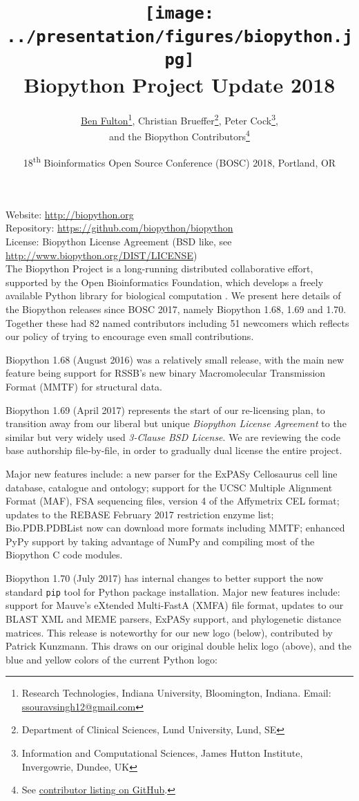 \documentclass[10pt,oneside]{article}
\title{%
\vspace{-1.5in}
\texttt{[image: ../presentation/figures/biopython.jpg]} \\
\vspace{3mm}Biopython Project Update 2018}
\author{
	\underline{Ben Fulton}\thanks{Research Technologies, Indiana University, Bloomington, Indiana. Email: \href{mailto:befulton@iu.edu}{ssouravsingh12@gmail.com}},
    Christian Brueffer\thanks{Department of Clinical Sciences, Lund University, Lund, SE},
    Peter Cock\thanks{Information and Computational Sciences, James Hutton Institute, Invergowrie, Dundee, UK},\\
    and the Biopython Contributors\thanks{See \href{https://github.com/biopython/biopython/blob/master/CONTRIB.rst}{contributor listing on GitHub}.}}
\date{18\textsuperscript{th} Bioinformatics Open Source Conference (BOSC) 2018, Portland, OR}
\begin{document}
\maketitle
\thispagestyle{empty}

\vspace{-0.2in}
\noindent
Website: \url{http://biopython.org} \\
Repository: \url{https://github.com/biopython/biopython} \\
License: Biopython License Agreement (BSD like, see \url{http://www.biopython.org/DIST/LICENSE}) \\

The Biopython Project is a long-running distributed collaborative effort,
supported by the Open Bioinformatics Foundation, which develops a freely
available Python library for biological computation \cite{AppNote}.
We present here details of the Biopython releases since BOSC 2017,
namely Biopython 1.68, 1.69 and 1.70. Together these had 82 named
contributors including 51 newcomers which reflects our policy of
trying to encourage even small contributions.

Biopython 1.68 (August 2016) was a relatively small release,
with the main new feature being support for RSSB's new binary
Macromolecular Transmission Format (MMTF) for structural data.

Biopython 1.69 (April 2017) represents the start of our re-licensing plan, to transition away
from our liberal but unique \emph{Biopython License Agreement} to the similar
but very widely used \emph{3-Clause BSD License}. We are reviewing the code
base authorship file-by-file, in order to gradually dual license the entire
project.

Major new features include: a new parser for the ExPASy Cellosaurus cell line
database, catalogue and ontology; support for the UCSC Multiple Alignment Format (MAF),
FSA sequencing files, version 4 of the Affymetrix CEL format; updates to the
REBASE February 2017 restriction enzyme list;
Bio.PDB.PDBList now can download more formats including MMTF;
enhanced PyPy support by taking advantage of NumPy and compiling most of the Biopython C code modules.

Biopython 1.70 (July 2017) has internal changes to better support the
now standard \verb|pip| tool for Python package installation.
Major new features include:
support for Mauve's eXtended Multi-FastA (XMFA) file format,
updates to our BLAST XML and MEME parsers, ExPASy support,
and phylogenetic distance matrices.
This release is noteworthy for our new logo (below),
contributed by Patrick Kunzmann. This draws on our original double helix logo
(above), and the blue and yellow colors of the current Python logo:
\end{document}
